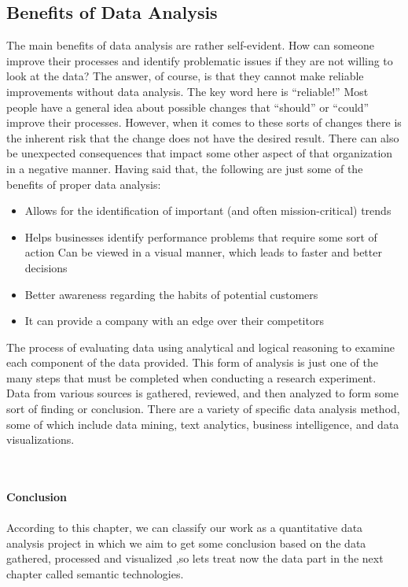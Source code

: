 \documentclass[a4paper,12pt,oneside]{report}
\begin{document}
{\subsection{Benefits of Data Analysis}
{The main benefits of data analysis are rather self-evident. How can someone improve their processes and identify problematic issues if they are not willing to look at the data? The answer, of course, is that they cannot make reliable improvements without data analysis. The key word here is “reliable!” Most people have a general idea about possible changes that “should” or “could” improve their processes. However, when it comes to these sorts of changes there is the inherent risk that the change does not have the desired result. There can also be unexpected consequences that impact some other aspect of that organization in a negative manner. Having said that, the following are just some of the benefits of proper data analysis:
\begin{itemize}
\item {Allows for the identification of important (and often mission-critical) trends}
\item {Helps businesses identify performance problems that require some sort of action Can be viewed in a visual manner, which leads to faster and better decisions}
\item {Better awareness regarding the habits of potential customers}
\item{It can provide a company with an edge over their competitors}
\end{itemize} 
The process of evaluating data using analytical and logical reasoning to examine each component of the data provided. This form of analysis is just one of the many steps that must be completed when conducting a research experiment. Data from various sources is gathered, reviewed, and then analyzed to form some sort of finding or conclusion. There are a variety of specific data analysis method, some of which include data mining, text analytics, business intelligence, and data visualizations.}\\ \\
\textbf{\large Conclusion}\\ \\

{According to this chapter, we can classify our work as a quantitative data analysis project in which we aim to get some conclusion based on the data gathered, processed and visualized ,so lets treat now the data part in the next chapter called semantic technologies.}
}
\end{document}
